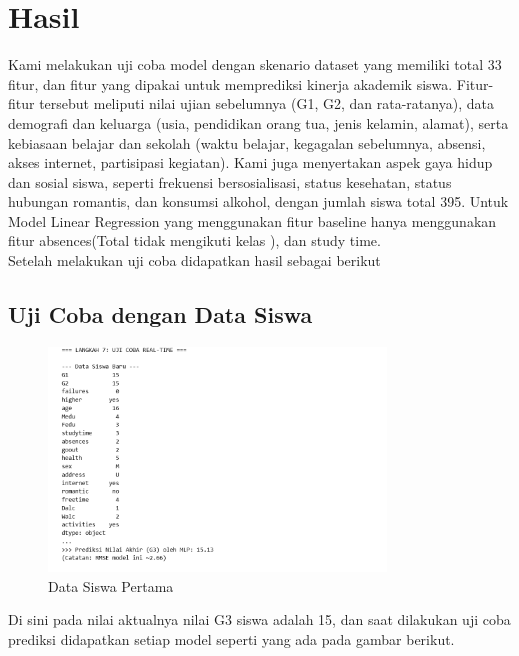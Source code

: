\chapter*{Hasil}

Kami melakukan uji coba model dengan skenario dataset yang memiliki total 33 fitur, dan fitur yang dipakai untuk memprediksi kinerja akademik siswa. Fitur-fitur tersebut 
meliputi nilai ujian sebelumnya {(G1, G2, dan rata-ratanya)}, data demografi dan keluarga {(usia, pendidikan orang tua, jenis kelamin, alamat)}, 
serta kebiasaan belajar dan sekolah (waktu belajar, kegagalan sebelumnya, absensi, akses internet, partisipasi kegiatan). Kami juga menyertakan 
aspek gaya hidup dan sosial siswa, seperti frekuensi bersosialisasi, status kesehatan, status hubungan romantis, dan konsumsi alkohol, dengan jumlah
siswa total 395. Untuk Model Linear Regression yang menggunakan fitur baseline hanya menggunakan fitur absences(Total tidak mengikuti kelas ), 
dan study time.\\

Setelah melakukan uji coba didapatkan hasil sebagai berikut

\section{Uji Coba dengan Data Siswa}

\begin{figure}[h]
    \centering
    \includegraphics[width=0.8\textwidth]{images/datasiswa2.png}
    \caption{Data Siswa Pertama}
    \label{fig:datasiswa1}
\end{figure}

Di sini pada nilai aktualnya nilai G3 siswa adalah 15, dan saat dilakukan uji coba prediksi didapatkan setiap model seperti yang ada 
pada gambar berikut.

